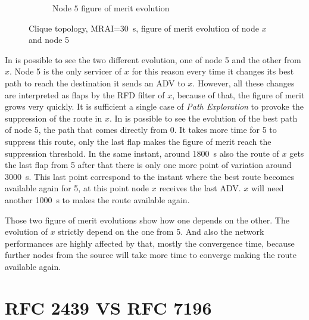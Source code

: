 \begin{figure}[h]
\begin{subfigure}[b]{0.494\textwidth}
         \caption{Node $5$ figure of merit evolution}
         \label{fig:clique_node5_30}
     \end{subfigure}
		\caption{Clique topology, \ac{MRAI}=\SI{30}{\second}, figure of merit evolution
		of node \(x\) and node \num{5}}
        \label{fig:RFD_2439_figure_of_merit}
\end{figure}

In  is possible to see the two different
evolution, one of node \num{5} and the other from $x$.
Node \num{5} is the only servicer of $x$ for this reason every time it changes
its best path to reach the destination it sends an \ac{ADV} to $x$.
However, all these changes are interpreted as flaps by the \ac{RFD} filter of $x$,
because of that, the figure of merit grows very quickly.
It is sufficient a single case of \textit{Path Exploration} to provoke the
suppression of the route in $x$.
In  is possible to see the evolution of the best path
of node \num{5}, the path that comes directly from \num{0}.
It takes more time for \num{5} to suppress this route, only the last flap
makes the figure of merit reach the suppression threshold.
In the same instant, around \SI{1800}{\second} also the route of $x$ gets the
last flap from \num{5} after that there is only one more point of variation
around \SI{3000}{\second}.
This last point correspond to the instant where the best route becomes available
again for \num{5}, at this point node $x$ receives the last \ac{ADV}.
$x$ will need another \SI{1000}{\second} to makes the route available again.

Those two figure of merit evolutions show how one depends on the other.
The evolution of $x$ strictly depend on the one from \num{5}.
And also the network performances are highly affected by that, mostly the convergence
time, because further nodes from the source will take more time to converge making
the route available again.

\section{RFC 2439 VS RFC 7196}
\label{sec:rfd_2439_Vs_7196}



